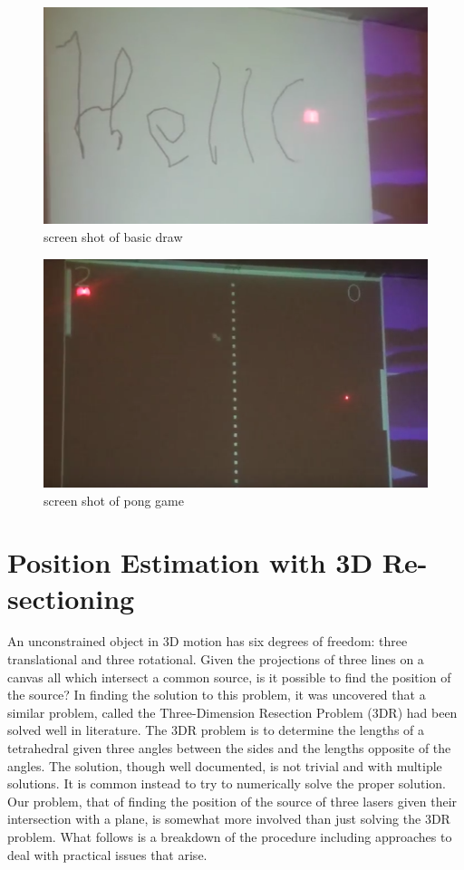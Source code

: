 \documentclass[a4paper]{article}
\begin{document}
\begin{figure}
	\includegraphics[width=\linewidth]{hello.png}
	\caption{screen shot of basic draw}
	\label{fig:hello}
\end{figure}

\begin{figure}
	\includegraphics[width=\linewidth]{pong.png}
	\caption{screen shot of pong game}
	\label{fig:pong}
\end{figure}

\section{Position Estimation with 3D Re-sectioning}
An unconstrained object in 3D motion has six degrees of freedom: three translational and three rotational.  Given the projections of three lines on a canvas all which intersect a common source, is it possible to find the position of the source? In finding the solution to this problem, it was uncovered that a similar problem, called the Three-Dimension Resection Problem (3DR) had been solved well in literature. The 3DR problem is to determine the lengths of a tetrahedral given three angles between the sides and the lengths opposite of the angles. The solution, though well documented, is not trivial and with multiple solutions. It is common instead to try to numerically solve the proper solution. Our problem, that of finding the position of the source of three lasers given their intersection with a plane, is somewhat more involved than just solving the 3DR problem.  What follows is a breakdown of the procedure including approaches to deal with practical issues that arise.
\end{document}
